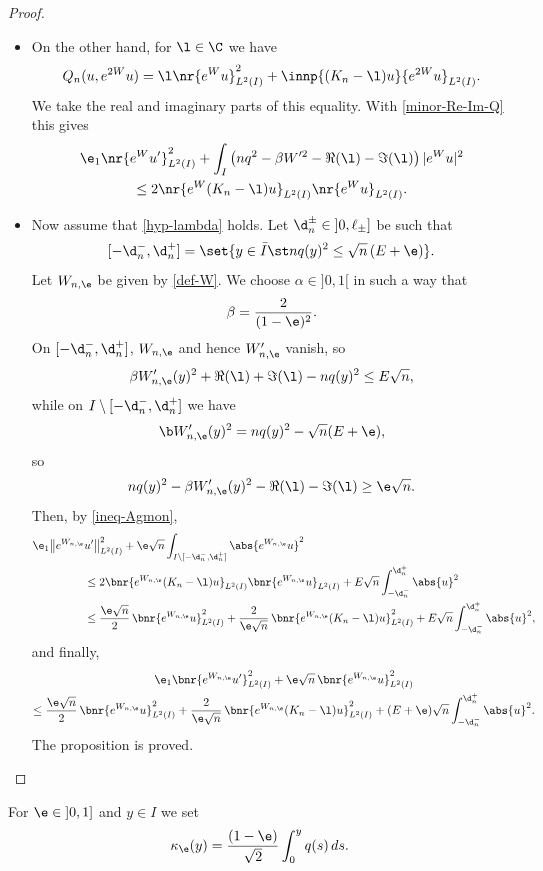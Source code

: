 \begin{proof}
\begin{itemize}
\item
On the other hand, for $\l \in \C$ we have
\[
Q_n (u,e^{2W}u) = \l \nr{e^W u}^2_{L^2(I)} + \innp{(K_n-\l)u}{e^{2W}u}_{L^2(I)}.
\]
We take the real and imaginary parts of this equality. With \eqref{minor-Re-Im-Q} this gives
\begin{multline} \label{ineq-Agmon}
\e_1 \nr{e^{W}u'}^2_{L^2(I)} + \int_{I} \left(nq^2 - \beta W'^2 - \Re(\l) - \Im(\l) \right) |e^W u|^2 \\
\leq 2 \nr{e^W (K_n-\l)u}_{L^2(I)} \nr{e^W u}_{L^2(I)}.
\end{multline}

\item
Now assume that \eqref{hyp-lambda} holds. Let $\d_n^\pm \in{}]0, \ell_\pm]$ be such that
\[
[-\d_n^-,\d_n^+] = \set{y \in \bar I \st nq(y)^2 \leq \sqrt{n}\,(E+\e)}.
\]
Let $W_{n,\e}$ be given by \eqref{def-W}. We choose $\alpha \in{}]0,1[$ in such a way that
\[
\beta = \frac {2}{(1-\e)^2}.
\]
On $[-\d_n^-,\d_n^+]$, $W_{n,\e}$ and hence $W'_{n,\e}$ vanish, so
\[
\beta W_{n,\e}'(y)^2 + \Re(\l) + \Im(\l) - nq(y)^2 \leq E \sqrt n,
\]
while on $I \setminus [-\d_n^-,\d_n^+]$ we have
\[
\b W_{n,\e}'(y)^2 = nq(y)^2 - \sqrt{n}(E+\e),
\]
so
\[
n q(y)^2 - \beta W_{n,\e}'(y)^2 - \Re(\l) - \Im(\l) \geq \e \sqrt n.
\]
Then, by \eqref{ineq-Agmon},
\begin{align*}
\e_1 \bigl\|e^{W_{n,\e}} &u'\bigr\|^2_{L^2(I)} + \e \sqrt n \int_{I \setminus [-\d_n^-,\d_n^+]} \abs{e^{W_{n,\e}} u}^2\\
& \leq 2 \bnr{e^{W_{n,\e}} (K_n-\l)u}_{L^2(I)} \bnr{e^{W_{n,\e}} u}_{L^2(I)} + E \sqrt n \int_{-\d_n^-}^{\d_n^+} \abs{u}^2\\
& \leq \frac {\e \sqrt n}2\, \bnr{e^{W_{n,\e}} u}^2_{L^2(I)} + \frac {2}{\e \sqrt n}\, \bnr{e^{W_{n,\e}} (K_n-\l)u}^2_{L^2(I)} + E \sqrt n \int_{-\d_n^-}^{\d_n^+} \abs{u}^2,
\end{align*}
and finally,
\begin{multline*}
\e_1 \bnr{e^{W_{n,\e}} u'}^2_{L^2(I)} + \e \sqrt n\,\bnr{e^{W_{n,\e}} u}^2_{L^2(I)}\\
\leq \frac {\e \sqrt n}{2}\, \bnr{e^{W_{n,\e}} u}^2_{L^2(I)} + \frac {2}{\e \sqrt n}\, \bnr{e^{W_{n,\e}} (K_n-\l)u}^2_{L^2(I)} + (E+\e) \sqrt n \int_{-\d_n^-}^{\d_n^+} \abs{u}^2.
\end{multline*}
The proposition is proved.\qedhere
\end{itemize}
\end{proof}

For $\e \in{}]0,1]$ and $y \in I$ we set
\[
\kappa_\e(y) = \frac {(1-\e)} {\sqrt 2} \int_0^y q(s) \, ds.
\]

